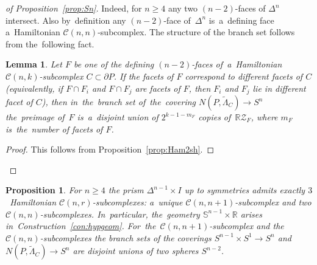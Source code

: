 \documentclass[12pt]{amsart}
\newtheorem{proposition}[formula]{Proposition}
\newtheorem{lemma}[formula]{Lemma}
\theoremstyle{definition}
\theoremstyle{remark}
\begin{document}
\begin{proof}[of Proposition~\ref{prop:Sn}]
Indeed, for $n\geqslant 4$ any two $(n-2)$-faces of $\Delta^n$ intersect. Also by~definition
any $(n-2)$-face of~$\Delta^n$ is~a~defining face a~Hamiltonian $\mathcal{C}(n,n)$-subcomplex.  The structure of the branch set follows from the~following fact.
\begin{lemma}\label{lem:RZF}
Let $F$ be one of the defining $(n-2)$-faces of~a~Hamiltonian \linebreak $\mathcal{C}(n,k)$-subcomplex $C\subset \partial P$. 
If the facets of $F$ correspond to different facets of $C$ (equivalently, if $F\cap F_i$ and $F\cap F_j$
are facets of $F$, then $F_i$ and $F_j$ lie in different facet of $C$), then in~the~branch set
of~the~covering $N(P,\widetilde{\Lambda}_C)\to S^n$ the~preimage of~$F$ 
is~a~disjoint union of $2^{k-1-m_F}$ copies of~$\mathbb R\mathcal{Z}_F$, where $m_F$ is~the~number 
of facets of $F$.
\end{lemma}
\begin{proof}
This follows from Proposition~\ref{prop:Ham2sh}.
\end{proof}
\end{proof}
\begin{proposition}\label{prop:Sn-1R}
For $n\geqslant 4$ the prism $\Delta^{n-1}\times I$ up to symmetries admits exactly 
$3$~Hamiltonian $\mathcal{C}(n,r)$-subcomplexes:
a~unique $\mathcal{C}(n,n+1)$-subcomplex and two $\mathcal{C}(n,n)$-subcomplexes. 
In~particular, the~geometry $\mathbb S^{n-1}\times \mathbb R$ arises in~Construction~\ref{con:hypgeom}.
For~the~$\mathcal{C}(n,n+1)$-subcomplex and the~$\mathcal{C}(n,n)$-subcomplexes 
the branch sets of the coverings $S^{n-1}\times S^1\to S^n$ and $N(P,\widetilde{\Lambda}_C)\to S^n$
are disjoint unions of two spheres $S^{n-2}$. 
\end{proposition}
\end{document}
